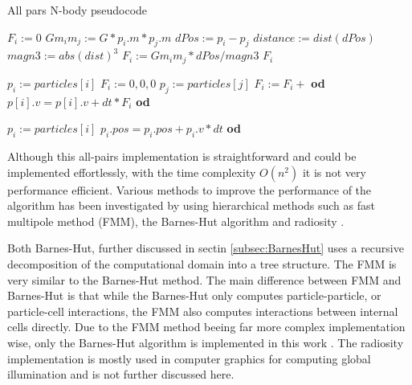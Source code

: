 \begin{algorithm}
    \caption{All pars N-body pseudocode}
    \label{alg:allpairspseudocode}
    \begin{algorithmic}[1]

        \State $F_i := 0$
        \State $Gm_im_j := G *p_i.m * p_j.m$
        \State $dPos := p_i - p_j$
        \State $distance := dist(dPos)$
        \State $magn3 := abs(dist)^3$
        \State $F_i := Gm_im_j * dPos / magn3$
        \State \Return $F_i$
        
    \EndProcedure
    
    
            \State $p_i := particles[i]$
            \State $F_i := {0,0,0}$
                \State $p_j := particles[j]$
                \State $F_i := F_i +$ 
            \EndFor
            \State \textbf{od} %
            \State $p[i].v = p[i].v + dt*F_i$
        \EndFor
        \State \textbf{od} %
        
            \State $p_i := particles[i]$
            \State $p_i.pos = p_i.pos + p_i.v * dt$
        \EndFor
        \State \textbf{od}
    \EndProcedure
        
        
    \end{algorithmic}
\end{algorithm}

Although this all-pairs implementation is straightforward and could be implemented effortlessly, with the time complexity $O(n^2)$ it is not very performance efficient. Various methods to improve the performance of the algorithm has been investigated by using hierarchical methods such as fast multipole method (FMM), the Barnes-Hut algorithm and radiosity \cite{singh1995load}\cite{barnes1986hierarchical}. 

Both Barnes-Hut, further discussed in sectin \ref{subsec:BarnesHut} uses a recursive decomposition of the computational domain into a tree structure. The FMM is very similar to the Barnes-Hut method. The main difference between FMM and Barnes-Hut is that while the Barnes-Hut only computes particle-particle, or particle-cell interactions, the FMM also computes interactions between internal cells directly. Due to the FMM method beeing far more complex implementation wise, only the Barnes-Hut algorithm is implemented in this work \cite{singh1995load}. The radiosity implementation is mostly used in computer graphics for computing global illumination and is not further discussed here.

